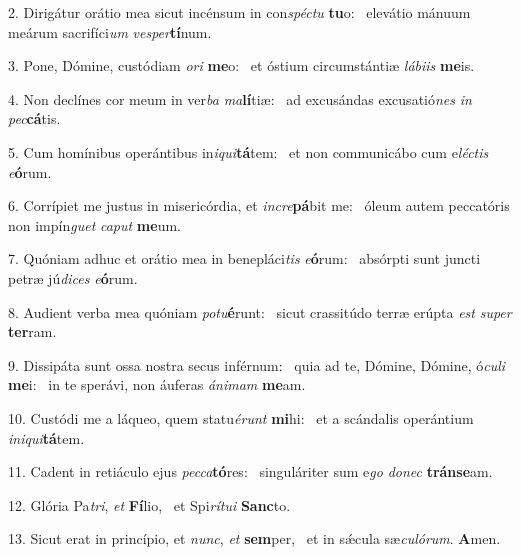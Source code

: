 2. Dirigátur orátio mea sicut incénsum in con\textit{spéc}\textit{tu} \textbf{tu}o: \ast\  elevátio mánuum meárum sacrifíci\textit{um} \textit{ves}\textit{per}\textbf{tí}num.\

3. Pone, Dómine, custódiam \textit{o}\textit{ri} \textbf{me}o: \ast\  et óstium circumstántiæ \textit{lá}\textit{bi}\textit{is} \textbf{me}is.\

4. Non declínes cor meum in ver\textit{ba} \textit{ma}\textbf{lí}tiæ: \ast\  ad excusándas excusatió\textit{nes} \textit{in} \textit{pec}\textbf{cá}tis.\

5. Cum homínibus operántibus in\textit{i}\textit{qui}\textbf{tá}tem: \ast\  et non communicábo cum e\textit{léc}\textit{tis} \textit{e}\textbf{ó}rum.\

6. Corrípiet me justus in misericórdia, et \textit{in}\textit{cre}\textbf{pá}bit me: \ast\  óleum autem peccatóris non impín\textit{guet} \textit{ca}\textit{put} \textbf{me}um.\

7. Quóniam adhuc et orátio mea in benepláci\textit{tis} \textit{e}\textbf{ó}rum: \ast\  absórpti sunt juncti petræ jú\textit{di}\textit{ces} \textit{e}\textbf{ó}rum.\

8. Audient verba mea quóniam \textit{pot}\textit{u}\textbf{é}runt: \ast\  sicut crassitúdo terræ erúpta \textit{est} \textit{su}\textit{per} \textbf{ter}ram.\

9. Dissipáta sunt ossa nostra secus inférnum: \dag\  quia ad te, Dómine, Dómine, ó\textit{cu}\textit{li} \textbf{me}i: \ast\  in te sperávi, non áuferas \textit{á}\textit{ni}\textit{mam} \textbf{me}am.\

10. Custódi me a láqueo, quem statu\textit{é}\textit{runt} \textbf{mi}hi: \ast\  et a scándalis operántium \textit{in}\textit{i}\textit{qui}\textbf{tá}tem.\

11. Cadent in retiáculo ejus \textit{pec}\textit{ca}\textbf{tó}res: \ast\  singuláriter sum e\textit{go} \textit{do}\textit{nec} \textbf{tráns}\textbf{e}am.\

12. Glória Pa\textit{tri}, \textit{et} \textbf{Fí}lio, \ast\  et Spi\textit{rí}\textit{tu}\textit{i} \textbf{Sanc}to.\

13. Sicut erat in princípio, et \textit{nunc}, \textit{et} \textbf{sem}per, \ast\  et in sǽcula sæ\textit{cu}\textit{ló}\textit{rum}. \textbf{A}men.\

